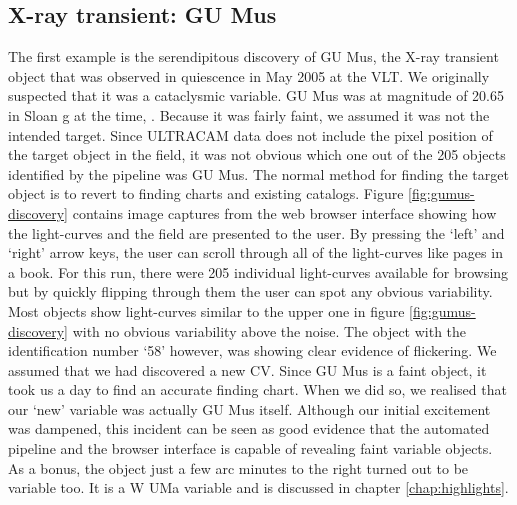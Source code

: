 \subsection{X-ray transient: GU Mus}
The first example is the serendipitous discovery of {GU Mus}, the X-ray transient object that was observed in quiescence in May 2005 at the VLT. We originally suspected that it was a cataclysmic variable. {GU Mus} was at magnitude of 20.65 in Sloan g at the time, \citep{tariq2010}. Because it was fairly faint, we assumed it was not the intended target. Since ULTRACAM data does not include the pixel position of the target object in the field, it was not obvious which one out of the 205 objects identified by the pipeline was {GU Mus}. The normal method for finding the target object is to revert to finding charts and existing catalogs. Figure \ref{fig:gumus-discovery} contains image captures from the web browser interface showing how the light-curves and the field are presented to the user. By pressing the `left' and `right' arrow keys, the user can scroll through all of the light-curves like pages in a book. For this run, there were 205 individual light-curves available for browsing but by quickly flipping through them the user can spot any obvious variability. Most objects show light-curves similar to the upper one in figure \ref{fig:gumus-discovery} with no obvious variability above the noise. The object with the identification number `58' however, was showing clear evidence of flickering. We assumed that we had discovered a new CV. Since {GU Mus} is a faint object, it took us a day to find an accurate finding chart. When we did so, we realised that our `new' variable was actually {GU Mus} itself. Although our initial excitement was dampened, this incident can be seen as good evidence that the automated pipeline and the browser interface is capable of revealing faint variable objects. As a bonus, the object just a few arc minutes to the right turned out to be variable too. It is a {W UMa} variable and is discussed in chapter \ref{chap:highlights}.

